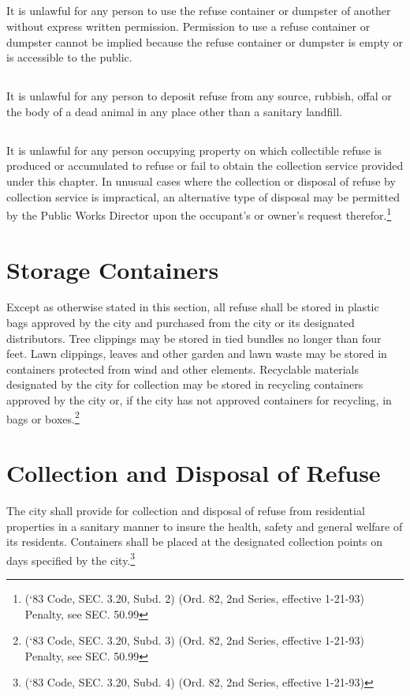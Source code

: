 \subsection{}
It is unlawful for any person to use the refuse container or dumpster of another without express written permission.  Permission to use a refuse container or dumpster cannot be implied because the refuse container or dumpster is empty or is accessible to the public.
\subsection{}
It is unlawful for any person to deposit refuse from any source, rubbish, offal or the body of a dead animal in any place other than a sanitary landfill.
\subsection{}
It is unlawful for any person occupying property on which collectible refuse is produced or accumulated to refuse or fail to obtain the collection service provided under this chapter.  In unusual cases where the collection or disposal of refuse by collection service is impractical, an alternative type of disposal may be permitted by the Public Works Director upon the occupant’s or owner’s request therefor.\footnote{(‘83 Code, SEC. 3.20, Subd. 2) (Ord. 82, 2nd Series, effective 1-21-93) Penalty, see SEC. 50.99}

\section{Storage Containers}
Except as otherwise stated in this section, all refuse shall be stored in plastic bags approved by the city and purchased from the city or its designated distributors.  Tree clippings may be stored in tied bundles no longer than four feet.  Lawn clippings, leaves and other garden and lawn waste may be stored in containers protected from wind and other elements.  Recyclable materials designated by the city for collection may be stored in recycling containers approved by the city or, if the city has not approved containers for recycling, in bags or boxes.\footnote{(‘83 Code, SEC. 3.20, Subd. 3) (Ord. 82, 2nd Series, effective 1-21-93) Penalty, see SEC. 50.99}

\section{Collection and Disposal of Refuse}
The city shall provide for collection and disposal of refuse from residential properties in a sanitary manner to insure the health, safety and general welfare of its residents.  Containers shall be placed at the designated collection points on days specified by the city.\footnote{(‘83 Code, SEC. 3.20, Subd. 4) (Ord. 82, 2nd Series, effective 1-21-93)}

